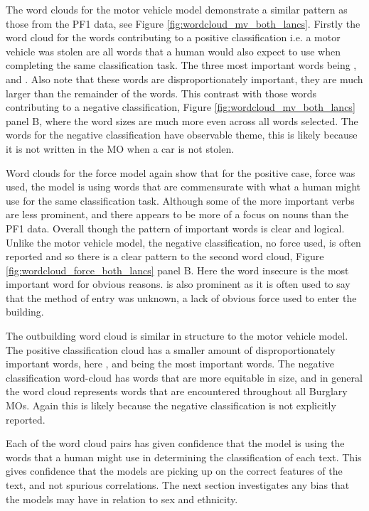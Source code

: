The word clouds for the motor vehicle model demonstrate a similar pattern as those from the PF1 data, see Figure \ref{fig:wordcloud_mv_both_lancs}. Firstly the word cloud for the words contributing to a positive classification i.e. a motor vehicle was stolen are all words that a human would also expect to use when completing the same classification task. The three most important words being ,  and . Also note that these words are disproportionately important, they are much larger than the remainder of the words. This contrast with those words contributing to a negative classification, Figure \ref{fig:wordcloud_mv_both_lancs} panel B, where the word sizes are much more even across all words selected. The words for the negative classification have observable theme, this is likely because it is not written in the MO when a car is not stolen.

Word clouds for the force model again show that for the positive case, force was used, the model is using words that are commensurate with what a human might use for the same classification task. Although some of the more important verbs are less prominent, and there appears to be more of a focus on nouns than the PF1 data. Overall though the pattern of important words is clear and logical. Unlike the motor vehicle model, the negative classification, no force used, is often reported and so there is a clear pattern to the second word cloud, Figure \ref{fig:wordcloud_force_both_lancs} panel B. Here the word insecure is the most important word for obvious reasons.  is also prominent as it is often used to say that the method of entry was unknown, a lack of obvious force used to enter the building. 

The outbuilding word cloud is similar in structure to the motor vehicle model. The positive classification cloud has a smaller amount of disproportionately important words, here ,  and  being the most important words. The negative classification word-cloud has words that are more equitable in size, and in general the word cloud represents words that are encountered throughout all Burglary MOs. Again this is likely because the  negative classification is not explicitly reported.

Each of the word cloud pairs has given confidence that the model is using the words that a human might use in determining the classification of each text. This gives confidence that the models are picking up on the correct features of the text, and not spurious correlations. The next section investigates any bias that the models may have in relation to sex and ethnicity.

